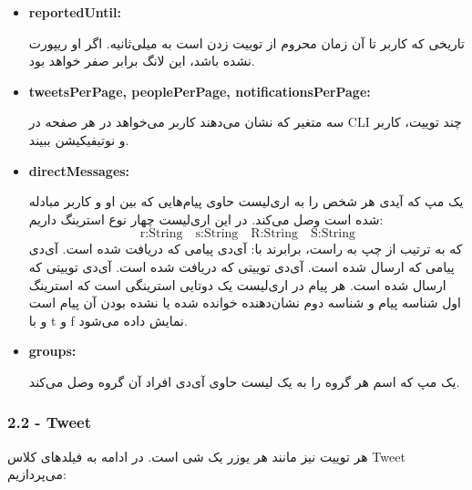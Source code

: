 \documentclass[12pt]{article}
\begin{document}
\begin{itemize}
\item
\begin{latin}
\textbf{reportedUntil:}
\end{latin}
تاریخی که کاربر تا آن زمان محروم از توییت زدن است به میلی‌ثانیه. اگر او ریپورت نشده باشد، این لانگ برابر صفر خواهد بود.

\item
\begin{latin}
\textbf{tweetsPerPage, peoplePerPage, notificationsPerPage:}
\end{latin}
سه متغیر که نشان می‌دهند کاربر می‌خواهد در هر صفحه در CLI چند توییت، کاربر و نوتیفیکیشن ببیند.

\item
\begin{latin}
\textbf{directMessages:}
\end{latin}
یک مپ که آیدی هر شخص را به اری‌لیست حاوی پیام‌هایی که بین او و کاربر مبادله شده است وصل می‌کند. در این اری‌لیست چهار نوع استرینگ داریم:
$$ \text{r:String} \quad \text{s:String} \quad \text{R:String} \quad \text{S:String}$$
که به ترتیب از چپ به راست، برابرند با: آی‌دی پیامی که دریافت شده است. آی‌دی پیامی که ارسال شده است. آی‌دی توییتی که دریافت شده است. آی‌دی توییتی که ارسال شده است.
هر پیام در اری‌لیست یک دوتایی استرینگی است که استرینگ اول شناسه پیام و شناسه دوم نشان‌دهنده خوانده شده یا نشده بودن آن پیام است و با t و f نمایش داده می‌شود.

\item
\begin{latin}
\textbf{groups:}
\end{latin}
یک مپ که اسم هر گروه را به یک لیست حاوی آی‌دی افراد آن گروه وصل می‌کند.

\end{itemize}

\LTR
\begin{latin}
\subsubsection*{2.2 - Tweet}
\end{latin}
\RTL
هر توییت نیز مانند هر یوزر یک شی است. در ادامه به فیلدهای کلاس Tweet می‌پردازیم:
\end{document}
